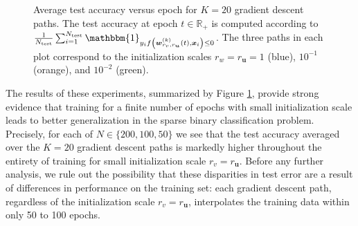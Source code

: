 \documentclass{article}
\begin{document}
\begin{figure}[H]
\centering
{}\hfill
{}\par 
{}
\caption{Average test accuracy versus epoch for $K=20$ gradient descent paths. The test accuracy at epoch $t \in \mathbb{R}_+$ is computed according to $\frac{1}{N_{\text{test}}} \sum_{i=1}^{N_{\text{test}}} \mathbbm{1}_{y_i f\left(\boldsymbol{w}_{r_v, r_{\boldsymbol{u}}}^{(k)}(t), \boldsymbol{x}_i\right) \leq 0}$. The three paths in each plot correspond to the initialization scales $r_w = r_{\boldsymbol{u}} = 1$ (blue), $10^{-1}$ (orange), and $10^{-2}$ (green).}\label{fig:testerrlogistic}
\end{figure}

The results of these experiments, summarized by Figure \ref{fig:testerrlogistic}, provide strong evidence that training for a finite number of epochs with small initialization scale leads to better generalization in the sparse binary classification problem. Precisely, for each of $N \in \{200, 100, 50\}$ we see that the test accuracy averaged over the $K=20$ gradient descent paths is markedly higher throughout the entirety of training for small initialization scale $r_v = r_{\boldsymbol{u}}$. Before any further analysis, we rule out the possibility that these disparities in test error are a result of differences in performance on the training set: each gradient descent path, regardless of the initialization scale $r_v = r_{\boldsymbol{u}}$, interpolates the training data within only 50 to 100 epochs. 
\end{document}
